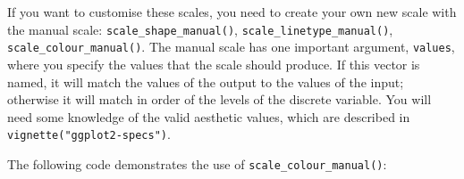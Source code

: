 If you want to customise these scales, you need to create your own new
scale with the manual scale: \texttt{scale\_shape\_manual()},
\texttt{scale\_linetype\_manual()}, \texttt{scale\_colour\_manual()}.
The manual scale has one important argument, \texttt{values}, where you
specify the values that the scale should produce. If this vector is
named, it will match the values of the output to the values of the
input; otherwise it will match in order of the levels of the discrete
variable. You will need some knowledge of the valid aesthetic values,
which are described in \texttt{vignette("ggplot2-specs")}.

The following code demonstrates the use of
\texttt{scale\_colour\_manual()}:

\begin{Shaded}
\begin{Highlighting}[]
\StringTok{ }\OperatorTok{+}\StringTok{ }
\StringTok{  }\NormalTok{() }\OperatorTok{+}\StringTok{ }
\StringTok{  }\NormalTok{()}
\OperatorTok{+}\StringTok{ }
\StringTok{  }\NormalTok{(}\NormalTok{(}\OperatorTok{+}\StringTok{ }
\StringTok{  }\NormalTok{(}
     \NormalTok{(}\NormalTok{, }\NormalTok{, }\NormalTok{, }\NormalTok{), }
     
\NormalTok{  )}

\StringTok{ }\NormalTok{(}
   \NormalTok{, }
   \NormalTok{, }
   \NormalTok{, }
   
\NormalTok{)}
\OperatorTok{+}\StringTok{ }
\StringTok{  }\NormalTok{(}\NormalTok{(}\OperatorTok{+}\StringTok{ }
\StringTok{  }\NormalTok{(}
\end{Highlighting}
\end{Shaded}

